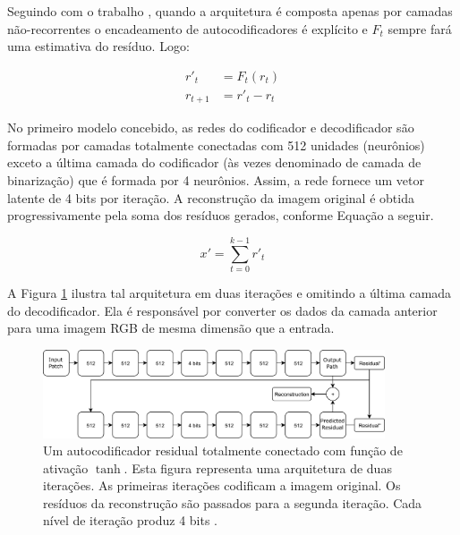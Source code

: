 Seguindo com  o trabalho \cite{Variable2016Toderici}, quando a arquitetura é composta apenas por camadas não-recorrentes o encadeamento de autocodificadores é explícito e $F_t$ sempre fará uma estimativa do resíduo. Logo:


\begin{equation}
\label{eq:reconst_escalar}
\begin{aligned}
r'_{t}  &= F_t(r_{t}) \\
r_{t+1} &= r'_{t} - r_{t}
\end{aligned}
\end{equation}

No primeiro modelo concebido, as redes do codificador e decodificador são formadas por camadas totalmente conectadas com 512 unidades (neurônios) exceto a última camada do codificador (às vezes denominado de camada de binarização) que é formada por 4 neurônios. Assim, a rede fornece um vetor latente de 4 bits por iteração. A reconstrução da imagem original é obtida progressivamente pela soma dos resíduos gerados, conforme Equação a seguir.

\begin{equation}
x' = \sum_{t=0}^{k-1} r'_{t}
\end{equation}


A Figura  \ref{fig:toderici1} ilustra tal arquitetura em duas iterações e omitindo a última camada do decodificador. Ela é responsável por converter os dados da camada anterior para uma imagem RGB de mesma dimensão que a entrada.




\begin{figure}[h]
	\centering
	\includegraphics[width=0.90\textwidth]{figuras/toderici_1.pdf}
	\caption[Autocodificador residual totalmente conectado.]{Um autocodificador residual totalmente conectado com  função de ativação $\tanh$. Esta figura representa uma arquitetura de duas iterações. As primeiras iterações codificam a imagem original. Os resíduos da reconstrução são passados para a segunda iteração. Cada nível de iteração produz 4 bits \cite{Variable2016Toderici,DeliverableJuly}.}
	\label{fig:toderici1}
\end{figure}


